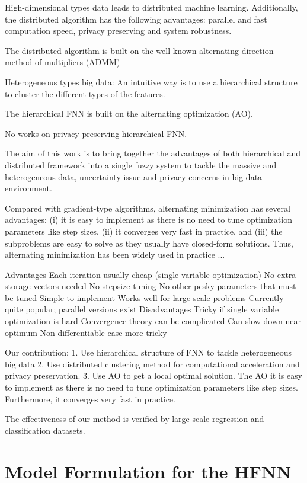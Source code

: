 \documentclass[journal,twocolumn,10pt]{IEEEtran}
\begin{document}
High-dimensional types data leads to distributed machine learning. Additionally, the distributed algorithm has the following advantages: parallel and fast computation speed, privacy preserving and system robustness.

The distributed algorithm is built on the well-known alternating direction method of multipliers (ADMM)

Heterogeneous types big data: An intuitive way is to use a hierarchical structure to cluster the different types of the features.

The hierarchical FNN is built on the alternating optimization (AO).

No works on privacy-preserving hierarchical FNN.

The aim of this work is to bring together the
advantages of both hierarchical and distributed framework into a single fuzzy system to tackle the massive and heterogeneous data, uncertainty issue and privacy concerns in big data environment.

Compared with gradient-type algorithms, alternating minimization has several advantages: (i) it is easy to implement as there is no need to tune optimization parameters like step sizes, (ii) it
converges very fast in practice, and (iii) the subproblems
are easy to solve as they usually have closed-form solutions.
Thus, alternating minimization has been widely used in practice ...

Advantages
Each iteration usually cheap (single variable optimization)
No extra storage vectors needed
No stepsize tuning
No other pesky parameters that must be tuned
Simple to implement
Works well for large-scale problems
Currently quite popular; parallel versions exist
Disadvantages
Tricky if single variable optimization is hard
Convergence theory can be complicated
Can slow down near optimum
Non-differentiable case more tricky

Our contribution:
1. Use hierarchical structure of FNN to tackle heterogeneous big data
2. Use distributed clustering method for computational acceleration and privacy preservation.
3. Use AO to get a local optimal solution. The AO it is easy to implement as there is no need to tune optimization parameters like step sizes. Furthermore, it converges very fast in practice.

The effectiveness of our method is verified by large-scale regression and classification datasets.

\section{Model Formulation for the HFNN}
\end{document}

